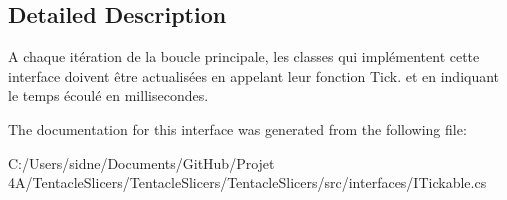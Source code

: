 \subsection{Detailed Description}
A chaque itération de la boucle principale, les classes qui implémentent cette interface doivent être actualisées en appelant leur fonction Tick. et en indiquant le temps écoulé en millisecondes. 



The documentation for this interface was generated from the following file\+:\begin{DoxyCompactItemize}
\item 
C\+:/\+Users/sidne/\+Documents/\+Git\+Hub/\+Projet 4\+A/\+Tentacle\+Slicers/\+Tentacle\+Slicers/\+Tentacle\+Slicers/src/interfaces/I\+Tickable.\+cs\end{DoxyCompactItemize}
